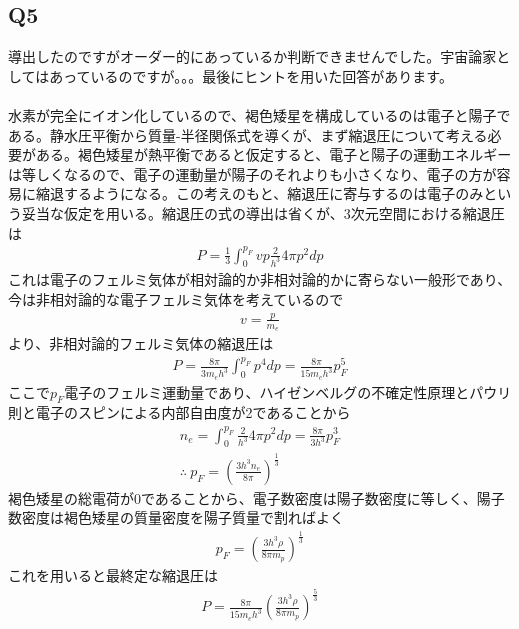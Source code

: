 \subsection{Q5}
導出したのですがオーダー的にあっているか判断できませんでした。宇宙論家としてはあっているのですが。。。最後にヒントを用いた回答があります。\\
\hrulefill\\
水素が完全にイオン化しているので、褐色矮星を構成しているのは電子と陽子である。静水圧平衡から質量-半径関係式を導くが、まず縮退圧について考える必要がある。褐色矮星が熱平衡であると仮定すると、電子と陽子の運動エネルギーは等しくなるので、電子の運動量が陽子のそれよりも小さくなり、電子の方が容易に縮退するようになる。この考えのもと、縮退圧に寄与するのは電子のみという妥当な仮定を用いる。縮退圧の式の導出は省くが、3次元空間における縮退圧は
\begin{align*}
    P=\frac{1}{3}\int^{p_F}_0vp\frac{2}{h^3}4\pi p^2dp
\end{align*}
これは電子のフェルミ気体が相対論的か非相対論的かに寄らない一般形であり、今は非相対論的な電子フェルミ気体を考えているので
\begin{align*}
    v=\frac{p}{m_e}
\end{align*}
より、非相対論的フェルミ気体の縮退圧は
\begin{align*}
    P=\frac{8\pi}{3m_eh^3}\int^{p_F}_0p^4dp=\frac{8\pi}{15m_eh^3}p^5_F
\end{align*}
ここで$p_F$電子のフェルミ運動量であり、ハイゼンベルグの不確定性原理とパウリ則と電子のスピンによる内部自由度が2であることから
\begin{align*}
    n_e=\int^{p_F}_0\frac{2}{h^3}4\pi p^2dp=\frac{8\pi}{3h^3}p^3_F\\
    \therefore\ p_F=\left(\frac{3h^3n_e}{8\pi}\right)^{\frac{1}{3}}
\end{align*}
褐色矮星の総電荷が0であることから、電子数密度は陽子数密度に等しく、陽子数密度は褐色矮星の質量密度を陽子質量で割ればよく
\begin{align*}
    p_F=\left(\frac{3h^3\rho}{8\pi m_p}\right)^{\frac{1}{3}}
\end{align*}
これを用いると最終定な縮退圧は
\begin{align*}
    P=\frac{8\pi}{15m_eh^3}\left(\frac{3h^3\rho}{8\pi m_p}\right)^{\frac{5}{3}}
\end{align*}

